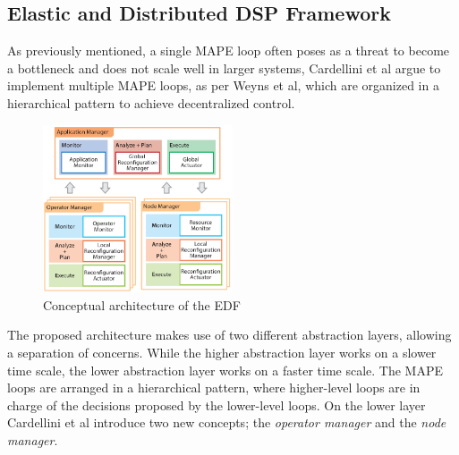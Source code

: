         \subsection{Elastic and Distributed DSP Framework}
        \label{sub:edf}
        As previously mentioned, a single MAPE loop often poses as a threat to become a bottleneck and does not scale well in larger systems\cite{cardellini}\cite{Cheng:2009:SES:1573856.1573858},
        Cardellini et al argue to implement multiple MAPE loops, as per Weyns et al\cite{Weyns2013}, which are organized in a hierarchical pattern to achieve decentralized control.
        \begin{figure}[hbt]
        \label{fig:hierarchical}
        \centering
        \includegraphics[width=0.5\textwidth]{Bilder/hierarchical.png}
        \caption{
                Conceptual architecture of the EDF\cite{cardellini}
                }
        \end{figure}
        The proposed architecture makes use of two different abstraction layers, allowing a separation of concerns. 
        While the higher abstraction layer works on a slower time scale, the lower abstraction layer works on a faster time scale.
        The MAPE loops are arranged in a hierarchical pattern, where higher-level loops are in charge of the decisions proposed by the lower-level loops.
        On the lower layer Cardellini et al introduce two new concepts; the \textit{operator manager} and the \textit{node manager}.

